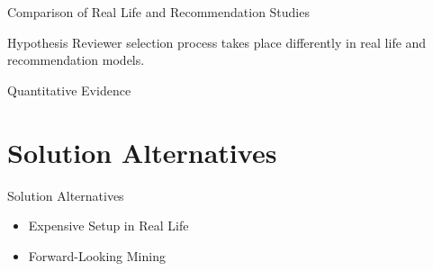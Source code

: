 \documentclass{beamer}
\begin{document}
    \begin{frame}{Comparison of Real Life and Recommendation Studies}
        \begin{block}{Hypothesis}
            \centering
            Reviewer selection process takes place differently in real life and recommendation models. 
        \end{block}
    \end{frame}    
    
    \begin{frame}{Quantitative Evidence}
        \begin{table}[]
        \centering
        \caption{PR Analysis of 4 Large OSS Projects \cite{ruangwan2019impact}.}
        \label{tab:my-table}
        \end{table}
    \end{frame}

\section{Solution Alternatives}
    \begin{frame}{Solution Alternatives}
    \begin{itemize}
        \item Expensive Setup in Real Life
        \item Forward-Looking Mining
    \end{itemize}
    \end{frame}
\end{document}

